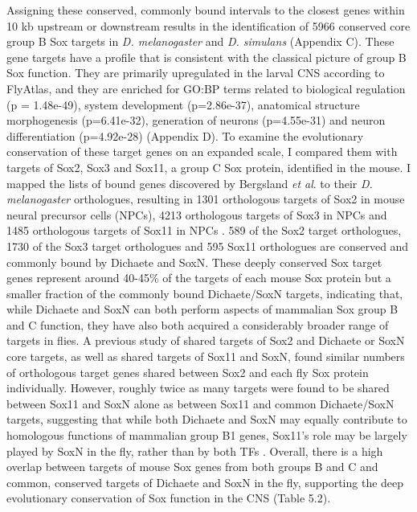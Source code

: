 Assigning these conserved, commonly bound intervals to the closest genes within 10 kb upstream or downstream results in the identification of 5966 conserved core group B Sox targets in \emph{D. melanogaster} and \emph{D. simulans} (Appendix C). These gene targets have a profile that is consistent with the classical picture of group B Sox function. They are primarily upregulated in the larval CNS according to FlyAtlas, and they are enriched for GO:BP terms related to biological regulation (p = 1.48e-49), system development (p=2.86e-37), anatomical structure morphogenesis (p=6.41e-32), generation of neurons (p=4.55e-31) and neuron differentiation (p=4.92e-28) (Appendix D). To examine the evolutionary conservation of these target genes on an expanded scale, I compared them with targets of Sox2, Sox3 and Sox11, a group C Sox protein, identified in the mouse. I mapped the lists of bound genes discovered by Bergsland \emph{et al}. to their \emph{D. melanogaster} orthologues, resulting in 1301 orthologous targets of Sox2 in mouse neural precursor cells (NPCs), 4213 orthologous targets of Sox3 in NPCs and 1485 orthologous targets of Sox11 in NPCs \citep{bergsland_sequentially_2011}. 589 of the Sox2 target orthologues, 1730 of the Sox3 target orthologues and 595 Sox11 orthologues are conserved and commonly bound by Dichaete and SoxN. These deeply conserved Sox target genes represent around 40-45\% of the targets of each mouse Sox protein but a smaller fraction of the commonly bound Dichaete/SoxN targets, indicating that, while Dichaete and SoxN can both perform aspects of mammalian Sox group B and C function, they have also both acquired a considerably broader range of targets in flies. A previous study of shared targets of Sox2 and Dichaete or SoxN core targets, as well as shared targets of Sox11 and SoxN, found similar numbers of orthologous target genes shared between Sox2 and each fly Sox protein individually. However, roughly twice as many targets were found to be shared between Sox11 and SoxN alone as between Sox11 and common Dichaete/SoxN targets, suggesting that while both Dichaete and SoxN may equally contribute to homologous functions of mammalian group B1 genes, Sox11’s role may be largely played by SoxN in the fly, rather than by both TFs \citep{ferrero_soxneuro_2014}. Overall, there is a high overlap between targets of mouse Sox genes from both groups B and C and common, conserved targets of Dichaete and SoxN in the fly, supporting the deep evolutionary conservation of Sox function in the CNS (Table 5.2).\\

